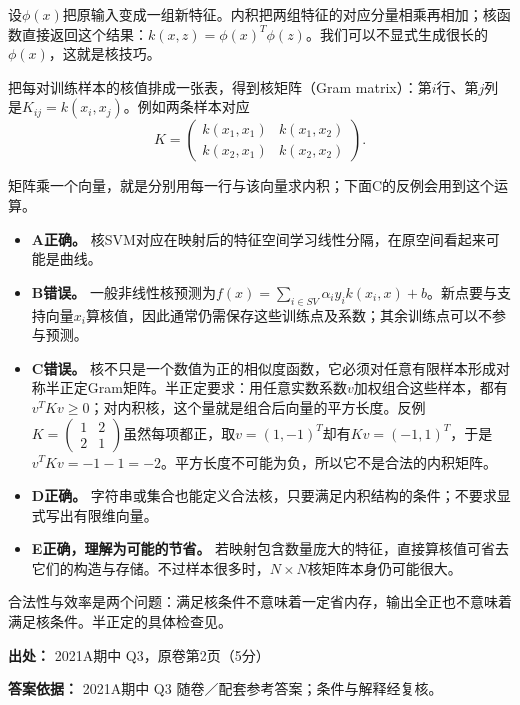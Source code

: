 设\(\phi(x)\)把原输入变成一组新特征。内积把两组特征的对应分量相乘再相加；核函数直接返回这个结果：\(k(x,z)=\phi(x)^T\phi(z)\)。我们可以不显式生成很长的\(\phi(x)\)，这就是核技巧。


把每对训练样本的核值排成一张表，得到核矩阵（Gram matrix）：第\(i\)行、第\(j\)列是\(K_{ij}=k(x_i,x_j)\)。例如两条样本对应
\[
K=\begin{pmatrix}k(x_1,x_1)&k(x_1,x_2)\\k(x_2,x_1)&k(x_2,x_2)\end{pmatrix}.
\]


矩阵乘一个向量，就是分别用每一行与该向量求内积；下面C的反例会用到这个运算。



\begin{itemize}

\item \textbf{A正确。} 核SVM对应在映射后的特征空间学习线性分隔，在原空间看起来可能是曲线。

\item \textbf{B错误。} 一般非线性核预测为\(f(x)=\sum_{i\in SV}\alpha_i y_i k(x_i,x)+b\)。新点要与支持向量\(x_i\)算核值，因此通常仍需保存这些训练点及系数；其余训练点可以不参与预测。

\item \textbf{C错误。} 核不只是一个数值为正的相似度函数，它必须对任意有限样本形成对称半正定Gram矩阵。半正定要求：用任意实数系数\(v\)加权组合这些样本，都有\(v^TKv\ge0\)；对内积核，这个量就是组合后向量的平方长度。反例\(K=\begin{pmatrix}1&2\\2&1\end{pmatrix}\)虽然每项都正，取\(v=(1,-1)^T\)却有\(Kv=(-1,1)^T\)，于是\(v^TKv=-1-1=-2\)。平方长度不可能为负，所以它不是合法的内积矩阵。

\item \textbf{D正确。} 字符串或集合也能定义合法核，只要满足内积结构的条件；不要求显式写出有限维向量。

\item \textbf{E正确，理解为可能的节省。} 若映射包含数量庞大的特征，直接算核值可省去它们的构造与存储。不过样本很多时，\(N\times N\)核矩阵本身仍可能很大。

\end{itemize}


合法性与效率是两个问题：满足核条件不意味着一定省内存，输出全正也不意味着满足核条件。半正定的具体检查见。


\textbf{出处：} 2021A期中 Q3，原卷第2页（5分）


\textbf{答案依据：} 2021A期中 Q3 随卷／配套参考答案；条件与解释经复核。
